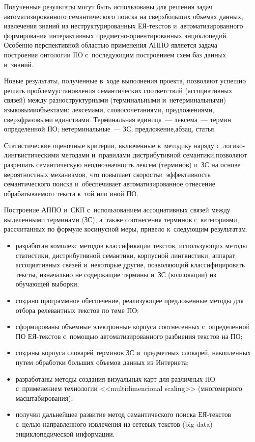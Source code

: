 \begin{multicols}{2}
     Полученные результаты могут быть использованы для решения задач
автоматизированного семантического поиска на сверхбольших объемах
данных, извлечения знаний из неструктурированных ЕЯ-текс\-тов и~автоматизированного формирования интерактивных
     пред\-мет\-но-ори\-ен\-ти\-ро\-ван\-ных энциклопедий. Особенно
перспективной областью применения АППО является задача построения
онтологии ПО с~последующим построением схем баз
данных и~знаний.

     Новые результаты, полученные в~ходе выполнения проекта, позволяют
успешно решать проблему\linebreak установления семантических соответствий
(ассоциативных связей) между разноструктурными (терминальными и~нетерминальными) языковыми\linebreak объекта\-ми: лексемами, словосочетаниями,
предложениями, сверхфразовыми единствами. Терминальная единица~---
лексема~--- термин определенной ПО; нетерминальные~---
ЗС, предложение,\linebreak абзац, статья.

     Статистические оценочные критерии, включенные в~методику наряду с~ло\-ги\-ко-линг\-ви\-сти\-че\-ски\-ми методами и~правилами дистрибутивной
семантики,\linebreak позволяют разрешать семантическую неоднозначность лексем
(терминов) и~ЗС на основе вероятностных механизмов, что повышает
скорость\linebreak и~эффективность семантического поиска и~обеспечивает
автоматизированное отнесение обрабатываемого текста к~той или иной
ПО.

     Построение АППО и~СКП с~использованием ассоциативных связей
между выделенными терминами (ЗС), а~также
соотнесения терминов с~категориями, рассчитанных по формуле косинусной
меры, привело к~сле\-ду\-ющим результатам:
     \begin{itemize}
     \item разработан комплекс методов классификации текстов,
использующих методы статистики, дистрибутивной семантики, корпусной
линг\-ви\-сти\-ки, аппарат ассоциативных связей и~некото\-рые другие,
позволяющий классифицировать тексты, изначально не содержащие
термины и~ЗС (коллокации) из обучающей выборки;
     \item создано программное обеспечение, реа\-ли\-зу\-ющее предложенные
методы для отбора релевантных текстов по теме ПО;
     \item сформированы объемные электронные корпуса соотнесенных с~определенной ПО ЕЯ-текс\-тов с~помощью
автоматизированного разби\-ения текстов на ПО;
     \item созданы корпуса словарей терминов ЗС и~предметных словарей, накопленных путем обработки больших
объемов данных из Интернета;
     \item разработаны методы создания визуальных карт для различных
ПО с~применением технологии <<multidimencional
scaling>> (многомерного масштабирования);
     \item получил дальнейшее развитие метод семантического поиска
     ЕЯ-текс\-тов с~целью направленного извлечения из сетевых текстов
(big data) энциклопедической информации.
     \end{itemize}


\end{multicols}
